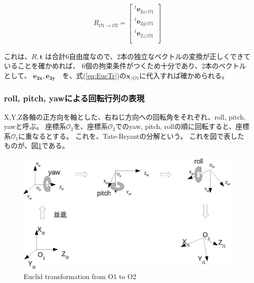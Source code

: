 \documentclass[10pt]{jarticle}
\begin{document}
\begin{eqnarray}
R_{\mathcal O1\rightarrow \mathcal O2} =
\left[ 
\begin{array}{ccc}
^t \boldsymbol  e_{2x/\mathcal O1} \\
^t \boldsymbol  e_{2y/\mathcal O1} \\
^t \boldsymbol  e_{2z/\mathcal O1} \\
\end{array} 
\right]
\end{eqnarray} 

これは、$R,\boldsymbol  t$ は合計6自由度なので、2本の独立なベクトルの変換が正しくできていることを確かめれば、
6個の拘束条件がつくため十分であり、2本のベクトルとして、
$\boldsymbol  {e_{2x},e_{2y}}$　を、式(\ref{eq:EucTr})の$\boldsymbol  x_{/O1}$に代入すれば確かめられる。

\subsubsection{roll, pitch, yawによる回転行列の表現}
X,Y,Z各軸の正方向を軸とした、右ねじ方向への回転角をそれぞれ、roll, pitch, yawと呼ぶ。
座標系$\mathcal{O}_2$を、座標系$\mathcal{O}_2$でのyaw, pitch, rollの順に回転すると、座標系$\mathcal{O}_1$に重なるとする。
これを、Tate-Bryantの分解という。
これを図で表したものが、図\ref{trans}である。
\begin{figure}[htb]
\includegraphics[width = 13cm]{EuclidTransformation.eps}
\caption{Euclid transformation from O1 to O2}
\label{trans}
\end{figure}
\end{document}
